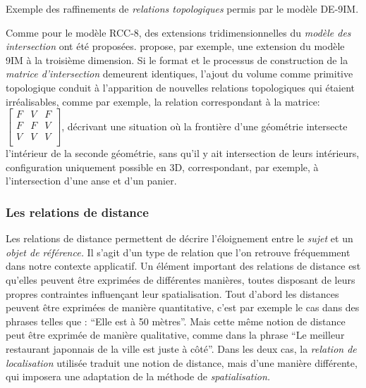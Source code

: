\begin{table}
  \centering
  
  \caption{Exemple des raffinements de \emph{relations topologiques}
    permis par le modèle DE-9IM.}
  \label{tab:9IM_vs_DE9IM}
\end{table}

Comme pour le modèle RCC-8, des extensions tridimensionnelles du
\emph{modèle des intersection} ont été
proposées. \textcite{DelaLosa2000} propose, par exemple, une extension
du modèle 9IM à la troisième dimension. Si le format et le processus
de construction de la \emph{matrice d'intersection} demeurent
identiques, l'ajout du volume comme primitive topologique conduit à
l'apparition de nouvelles relations topologiques qui étaient
irréalisables, comme par exemple, la relation correspondant à la
matrice: 
%
\(\left[
  \begin{smallmatrix}
    F&V&F\\
    F&F&V\\
    V&V&V\\
  \end{smallmatrix}
\right]\),
%
décrivant une situation où la frontière d'une géométrie intersecte
l'intérieur de la seconde géométrie, sans qu'il y ait intersection de
leurs intérieurs, configuration uniquement possible en 3D,
correspondant, par exemple, à l'intersection d'une anse et d'un
panier.

\subsubsection{Les relations de distance}




Les relations de distance permettent de décrire l'éloignement entre le
\emph{sujet} et un \emph{objet de référence.} Il s'agit d'un type de
relation que l'on retrouve fréquemment dans notre contexte applicatif.
Un élément important des relations de distance est qu'elles peuvent
être exprimées de différentes manières, toutes disposant de leurs
propres contraintes influençant leur spatialisation. Tout d'abord les
distances peuvent être exprimées de manière quantitative, c'est par
exemple le cas dans des phrases telles que : \enquote{Elle est à 50
  mètres}. Mais cette même notion de distance peut être exprimée de
manière qualitative, comme dans la phrase \enquote{Le meilleur
  restaurant japonnais de la ville est juste à côté}. Dans les deux
cas, la \emph{relation de localisation} utilisée traduit une notion de
distance, mais d'une manière différente, qui imposera une adaptation
de la méthode de \emph{spatialisation.}

